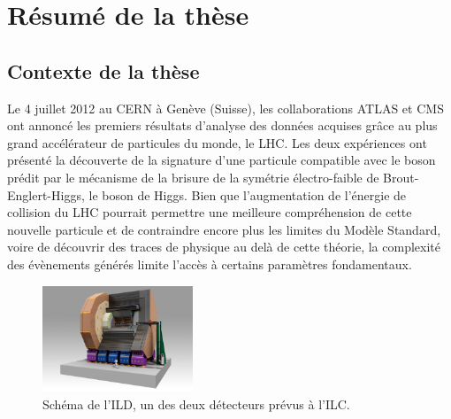 \chapter{Résumé de la thèse}
\setcounter{chapter}{1}
\setcounter{section}{0}


  \section{Contexte de la thèse}

  Le 4 juillet 2012 au CERN à Genève (Suisse), les collaborations ATLAS et CMS ont annoncé les premiers résultats d'analyse des données acquises grâce au plus grand accélérateur de particules du monde, le \acrfull{LHC}\cite{Aad2012}\cite{Chatrchyan2012}. 
  Les deux expériences ont présenté la découverte de la signature d'une particule compatible avec le boson prédit par le mécanisme de la brisure de la symétrie électro-faible de Brout-Englert-Higgs, le boson de Higgs.
  Bien que l'augmentation de l'énergie de collision du LHC pourrait permettre une meilleure compréhension de cette nouvelle particule et de contraindre encore plus les limites du Modèle Standard, voire de découvrir des traces de physique au delà de cette théorie, la complexité des évènements générés limite l'accès à certains paramètres fondamentaux.
  
  \begin{figure}[!h]
    \centering
    \includegraphics[width = 0.4\textwidth]{Pictures/ILC/ILD.jpg}
    \caption{Schéma de l'ILD, un des deux détecteurs prévus à l'ILC.}
    \label{fig:ILD_resume}
  \end{figure}
 
